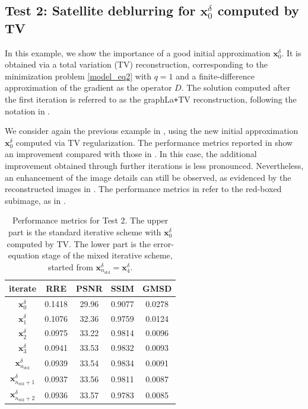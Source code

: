 \documentclass{article}
\theoremstyle{remark}
\newcommand{\bx}{{\bm{x}}}
\begin{document}
\subsection[Test 2: Satellite deblurring with TV initialization]{Test 2: Satellite deblurring for $\bx_0^\delta$ computed by TV}

In this example, we show the importance of a good initial approximation $\bx_0^\delta$.
It is obtained via a total variation (TV) reconstruction, corresponding to the minimization problem \cref{model_eq2} with $q=1$ and a finite-difference approximation of the gradient as the operator $D$.
The solution computed after the first iteration is referred to as the graphLa\texttt{+}TV reconstruction, following the notation in \cite{bianchi2025data}.

    We consider again the previous example in , using the new initial approximation \(\bx_0^\delta\) computed via TV regularization. The performance metrics reported in  show an improvement compared with those in . In this case, the additional improvement obtained through further iterations is less pronounced. Nevertheless, an enhancement of the image details can still be observed, as evidenced by the reconstructed images in . The performance metrics in  refer to the red-boxed subimage, as in .

    \begin{table}
    \centering
        \begin{tabular}{c|c|c|c | c}
           iterate & RRE & PSNR & SSIM & GMSD \\ \hline
                $\bx_{0}^{\delta}$ & 0.1418  & 29.96 & 0.9077 & 0.0278\\
                $\bx_{1}^{\delta}$  & 0.1076 & 32.36 & 0.9759 & 0.0124\\ 
			$\bx_{2}^{\delta}$  & 0.0975 & 33.22 & 0.9814 & 0.0096 \\ 
			$\bx_{3}^{\delta}$  & 0.0941 & 33.53 & 0.9832 & 0.0093 \\ 
		$\bx_{n_{\mathrm{std}}}^{\delta}$  & 0.0939 & 33.54 & 0.9834 & 0.0091 \\ \hline
        $\bx_{n_{\mathrm{std}}+1}^{\delta}$  &  0.0937 & 33.56 & 0.9811 & 0.0087\\ 
		$\bx_{n_{\mathrm{std}}+2}^{\delta}$  &  0.0936 & 33.57 & 0.9783 & 0.0085\\ 
        \end{tabular}
		\caption{Performance metrics for Test 2. The upper part is the standard iterative scheme with $\bx_{0}^{\delta}$ computed by TV. The lower part is the error-equation stage of the mixed iterative scheme, started from $\bx_{n_{\mathrm{std}}}^{\delta}=\bx_{4}^{\delta}$.}
		\label{Table: test_TV}
	\end{table}
\end{document}
